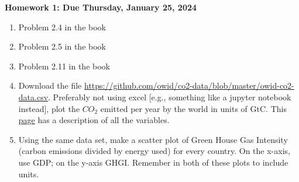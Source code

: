 \documentclass[11pt]{article}
\begin{document}
\newcommand{\problem}[1]{%
\item {#1}
}
\newcommand{\probl}[1]{\label{#1}}
\def\be{\begin{equation}}
\def\ee{\end{equation}}
\def\bea{\begin{eqnarray}}
\def\eea{\end{eqnarray}}
\newcommand{\vs}{\nonumber\\}
\def\across{a^\times}
\def\tcross{T^\times}
\def\ccross{C^\times}
\newcommand{\ec}[1]{Eq.~(\ref{eq:#1})}
\newcommand{\eec}[2]{Eqs.~(\ref{eq:#1}) and (\ref{eq:#2})}
\newcommand{\Ec}[1]{(\ref{eq:#1})}
\newcommand{\eql}[1]{\label{eq:#1}}
\newcommand{\sfig}[2]{
\texttt{[image: \#1]}
        }
\newcommand{\sfigr}[2]{
\texttt{[image: \#1]}
        }
\newcommand{\sfigra}[2]{
\texttt{[image: \#1]}
        }
\newcommand{\Sfig}[2]{
   \begin{figure}[thbp]
   \begin{center}
    \sfig{#1.pdf}{0.5\columnwidth}
    \caption{{\small #2}}
    \label{fig:#1}
     \end{center}
   \end{figure}
}
\newcommand\dirac{\delta_D}
\newcommand{\rf}[1]{\ref{fig:#1}}
\newcommand\rhoc{\rho_{\rm cr}}
\newcommand\zs{D_S}
\newcommand\dts{\Delta t_{\rm Sh}}
\newcommand\zle{D_L}
\newcommand\zsl{D_{SL}}
\newcommand\sh{\gamma}
\newcommand\surb{\mathcal{S}}
\newcommand\psf{\mathcal{P}}
\newcommand\spsf{\sigma_{\rm PSF}}
\newcommand\bei{\begin{itemize}}
\newcommand\eei{\end{itemize}}
\begin{centering}
{\bf Homework 1: Due Thursday, January 25, 2024}
\end{centering}

\begin{enumerate}

\problem{Problem 2.4 in the book}
\problem{Problem 2.5 in the book}
\problem{Problem 2.11 in the book}
\problem{Download the file \href{https://github.com/owid/co2-data/blob/master/owid-co2-data.csv}{https://github.com/owid/co2-data/blob/master/owid-co2-data.csv}. Preferably not using excel [e.g., something like a jupyter notebook instead], plot the $CO_2$ emitted per year by the world in units of GtC. This \href{https://github.com/owid/co2-data/blob/master/owid-co2-codebook.csv}{page} has a description of all the variables.}
\problem{Using the same data set, make a scatter plot of Green House Gas Intensity (carbon emissions divided by energy used) for every country. On the x-axis, use GDP; on the y-axis GHGI. Remember in both of these plots to include units.}

\end{enumerate}
\end{document}
